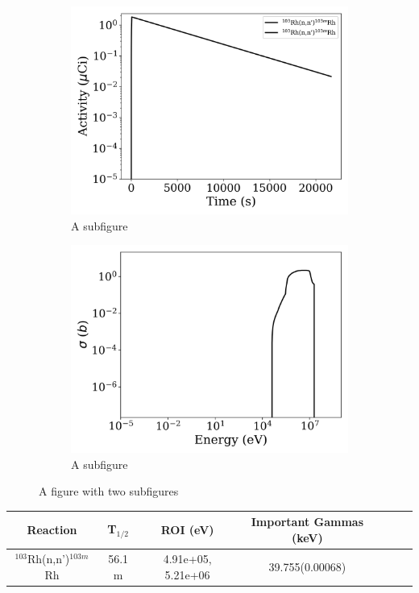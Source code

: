 \begin{figure}[h]
\centering
\begin{subfigure}{.5\textwidth}
  \centering
     \includegraphics[width=.8\textwidth]{plot/Rh-103(n,n')Rh-103m_library1} 

  \caption{A subfigure}
  \label{fig:sub1}
\end{subfigure}%
\begin{subfigure}{.5\textwidth}
  \centering
     \includegraphics[width=.8\textwidth]{plot/Rh-103(n,n')Rh-103m} 

  \caption{A subfigure}
  \label{fig:sub2}
\end{subfigure}
\caption{A figure with two subfigures}
\label{fig:test}
\end{figure}

\begin{table}[h]
\centering
\begin{tabular}{ |c|c|c|c|c|c|c| }
 \hline
 Reaction & T$_{1/2}$ & ROI (eV) & Important Gammas (keV) \\
 \hline 
 $^{103}$Rh(n,n')$^{103m}$Rh & 56.1 m & 4.91e+05, 5.21e+06 & 39.755(0.00068) \\ 
\hline
\end{tabular}
\end{table}
